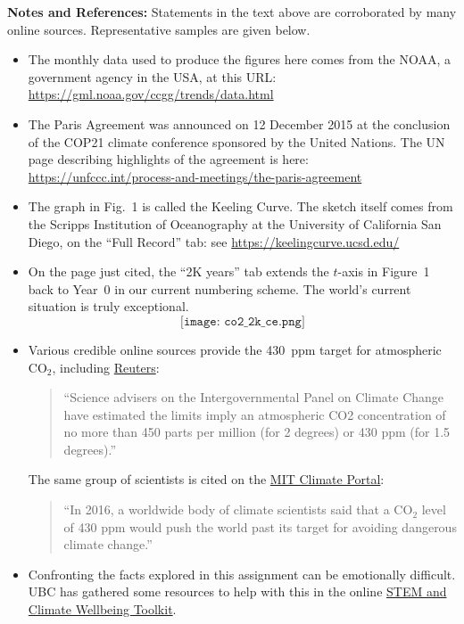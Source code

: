 \documentclass{exam}
\begin{document}
\par\vfill\clearpage

\noindent\textbf{Notes and References:}
Statements in the text above are corroborated by
many online sources.
Representative samples are given below.

\begin{itemize}
\item 
The monthly data used to produce the figures here comes from the NOAA,
a government agency in the USA, at this URL:
\url{https://gml.noaa.gov/ccgg/trends/data.html}
\item
The Paris Agreement was announced on 12 December 2015 at the
conclusion of the COP21 climate conference sponsored by the United
Nations. The UN page describing highlights of the agreement is here:
\url{https://unfccc.int/process-and-meetings/the-paris-agreement}
\item
The graph in Fig.~1 is called the Keeling Curve.
The sketch itself comes from the Scripps Institution of Oceanography
at the University of California San Diego, on the ``Full Record'' tab:
see \url{https://keelingcurve.ucsd.edu/}
\item
On the page just cited, the ``2K years'' tab extends the $t$-axis in
Figure~1 back to Year~0 in our current numbering scheme. 
The world's current situation is truly exceptional.
\[
\texttt{[image: co2\_2k\_ce.png]}
\]
\item
Various credible online sources provide the 430~ppm target for
atmospheric CO$_2$, including \href{https://www.reuters.com/article/idUSKCN1RT0OZ/}{Reuters}:
\begin{quote}
``Science advisers on the Intergovernmental Panel on Climate Change 
have estimated the limits imply an atmospheric CO2 concentration of no more than 
450 parts per million (for 2 degrees) or 430 ppm (for 1.5 degrees).''
\end{quote}
The same group of scientists is cited on the 
\href{https://climate.mit.edu/ask-mit/what-ideal-level-carbon-dioxide-atmosphere-human-life}{MIT Climate Portal}:
\begin{quote}
``In 2016, a worldwide body of climate scientists said that a CO$_2$ level of 430 ppm would push the world past its target for avoiding dangerous climate change.''
\end{quote}
\item
Confronting the facts explored in this assignment can be emotionally difficult.
UBC has gathered some resources to help with this in the online
\href{https://climateemergency.ubc.ca/stem-and-climate-wellbeing-toolkit/}{STEM and Climate Wellbeing Toolkit}.
\end{itemize}
\end{document}
